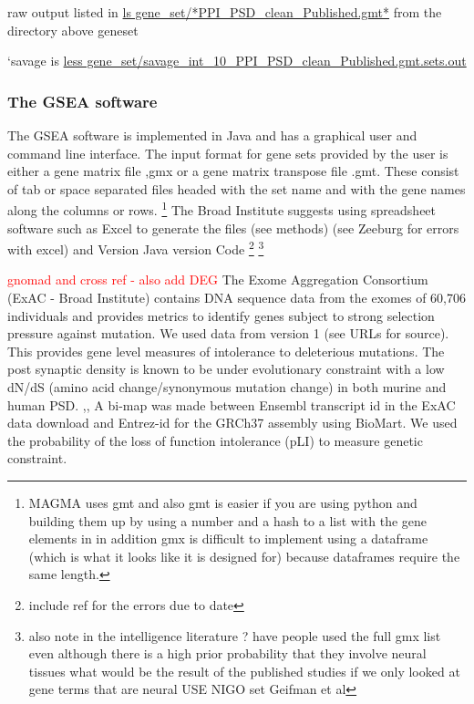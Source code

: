 raw output listed in \url{ls gene_set/*PPI_PSD_clean_Published.gmt*} from the directory above geneset

`savage is \url{less gene_set/savage_int_10_PPI_PSD_clean_Published.gmt.sets.out }



\subsubsection{The GSEA software}

The GSEA software is implemented in Java and has a graphical user and command line interface. The input format for gene sets provided by the user is either a gene matrix file ,gmx or a gene matrix transpose file .gmt.
These consist of tab or space separated files headed with the set name and with the gene names along the columns or rows.
 \footnote{MAGMA uses gmt and also gmt is easier if you are using python and building them up by using a number and a hash to a list with the gene elements in in addition gmx is difficult to implement using a dataframe (which is what it looks like it is designed for) because dataframes require the same length.} The Broad Institute suggests using spreadsheet software such as Excel to generate the files (see methods) (see Zeeburg \cite{zeeberg2004mistaken} for errors with excel) and \cite{ziemann2016gene}
 Version Java version Code
\footnote{include ref for the errors due to date}
 \footnote{also note in the intelligence literature ? have people used the full gmx list even although there is a high prior probability that they involve neural tissues what would be the result of the published studies if we only looked at gene terms that are neural USE NIGO set  Geifman et al}



\textcolor{red}{gnomad and cross ref - also add DEG}
The Exome Aggregation Consortium (ExAC - Broad Institute) contains DNA sequence data from the exomes of 60,706 individuals and provides metrics to identify genes subject to strong selection pressure against mutation. \cite{lek2016analysis}  We used data from version 1 (see URLs for source). This provides gene level measures of intolerance to deleterious mutations. The post synaptic density is known to be under evolutionary constraint with a low dN/dS (amino acid change/synonymous mutation change) in both murine and human PSD. \cite{ryan2009origin},\cite{bayes2012comparative},\cite{bayes2011characterization}  A bi-map was made between Ensembl transcript id in the ExAC data download and Entrez-id for the GRCh37 assembly using BioMart. \cite{smedley2015biomart}  We used the probability of the loss of function intolerance (pLI) to measure genetic constraint.

